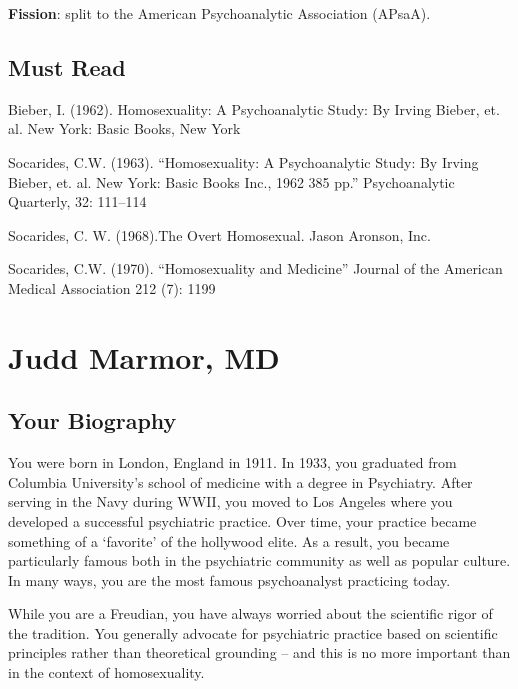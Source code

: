 \begin{refsection}
\textbf{Fission}: split to the American Psychoanalytic Association (APsaA).

\section{Must Read}
\label{mustread}

Bieber, I. (1962). Homosexuality: A Psychoanalytic Study: By Irving Bieber, et. al. New York: Basic Books, New York

Socarides, C.W. (1963). “Homosexuality: A Psychoanalytic Study: By Irving Bieber, et. al. New York: Basic Books Inc., 1962 385 pp.” Psychoanalytic Quarterly, 32: 111--114

Socarides, C. W. (1968).The Overt Homosexual. Jason Aronson, Inc.

Socarides, C.W. (1970). “Homosexuality and Medicine” Journal of the American Medical Association 212 (7): 1199

\chapter{Judd Marmor, MD}
\label{juddmarmormd}

\section{Your Biography}
\label{yourbiography}

You were born in London, England in 1911. In 1933, you graduated from Columbia University's school of medicine with a degree in Psychiatry. After serving in the Navy during WWII, you moved to Los Angeles where you developed a successful psychiatric practice. Over time, your practice became something of a `favorite' of the hollywood elite. As a result, you became particularly famous both in the psychiatric community as well as popular culture. In many ways, you are the most famous psychoanalyst practicing today.

While you are a Freudian, you have always worried about the scientific rigor of the tradition. You generally advocate for psychiatric practice based on scientific principles rather than theoretical grounding – and this is no more important than in the context of homosexuality.


\end{refsection}
